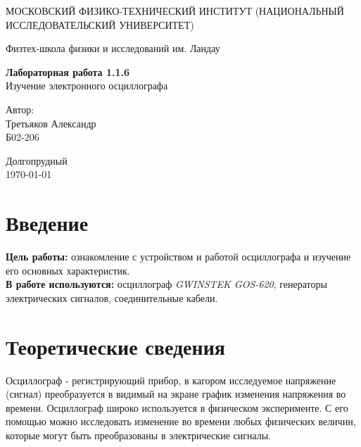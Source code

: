\documentclass[a4paper,12pt]{article} %
\date{\today}
\begin{document}
\begin{titlepage}
	\begin{center}
		{\large МОСКОВСКИЙ ФИЗИКО-ТЕХНИЧЕСКИЙ ИНСТИТУТ (НАЦИОНАЛЬНЫЙ ИССЛЕДОВАТЕЛЬСКИЙ УНИВЕРСИТЕТ)}
	\end{center}
	\begin{center}
		{\large Физтех-школа физики и исследований им. Ландау}
	\end{center}
	
	
	\vspace{4.5cm}
	{\huge
		\begin{center}
			{\bf Лабораторная работа 1.1.6}\\
				Изучение электронного осциллографа
		\end{center}
	}
	\vspace{2cm}
	\begin{flushright}
		{\LARGE Автор:\\ Третьяков Александр \\
			\vspace{0.2cm}
			Б02-206}
	\end{flushright}
	\vspace{8cm}
	\begin{center}
		Долгопрудный\\
		\today
	\end{center}
\end{titlepage}

\section{Введение}

\textbf{Цель работы:} ознакомление с устройством и работой осциллографа и изучение его основных характеристик.\\
\textbf{В работе используются:} осциллограф \textit{GWINSTEK GOS-620}, генераторы электрических сигналов, соединительные кабели.

\section{Теоретические сведения}

Осциллограф - регистрирующий прибор, в кагором исследуемое напряжение (сигнал) преобразуется в видимый на экране график изменения напряжения во времени. Осциллограф широко используется в физическом эксперименте. С его помощью можно исследовать изменение во времени любых физических величин, которые могут быть преобразованы в электрические сигналы.
\end{document}
